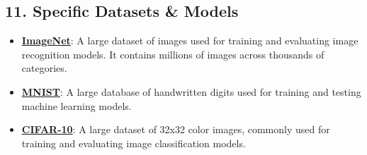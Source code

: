 \documentclass{article}%
\begin{document}
\subsection{11.  Specific Datasets \& Models}%
\label{subsec:11.SpecificDatasetsModels}%
\begin{itemize}[leftmargin=*]%
\item \href{https://purdue.brightspace.com/d2l/common/assets/pdfjs-d2l-dist/1.0.14-legacy/web/viewer.html?file=\%2Fcontent\%2Fenforced\%2F1095467-wl.202510.CS.24300.001\%2F09L1-cnn.pdf\%3Fou\%3D1095467\&lang=en-us\&container=d2l-fileviewer-rendered-pdf\&fullscreen=d2l-fileviewer-rendered-pdf-dialog\&height=667#page=3}{\textbf{ImageNet}}: A large dataset of images used for training and evaluating image recognition models. It contains millions of images across thousands of categories.%
\item \href{https://purdue.brightspace.com/d2l/common/assets/pdfjs-d2l-dist/1.0.14-legacy/web/viewer.html?file=\%2Fcontent\%2Fenforced\%2F1095467-wl.202510.CS.24300.001\%2F09L1-cnn.pdf\%3Fou\%3D1095467\&lang=en-us\&container=d2l-fileviewer-rendered-pdf\&fullscreen=d2l-fileviewer-rendered-pdf-dialog\&height=667#page=21}{\textbf{MNIST}}: A large database of handwritten digits used for training and testing machine learning models.%
\item \href{https://purdue.brightspace.com/d2l/common/assets/pdfjs-d2l-dist/1.0.14-legacy/web/viewer.html?file=\%2Fcontent\%2Fenforced\%2F1095467-wl.202510.CS.24300.001\%2F09L1-cnn.pdf\%3Fou\%3D1095467\&lang=en-us\&container=d2l-fileviewer-rendered-pdf\&fullscreen=d2l-fileviewer-rendered-pdf-dialog\&height=667#page=23}{\textbf{CIFAR-10}}: A large dataset of 32x32 color images, commonly used for training and evaluating image classification models.%
\end{itemize}

%
\end{document}
